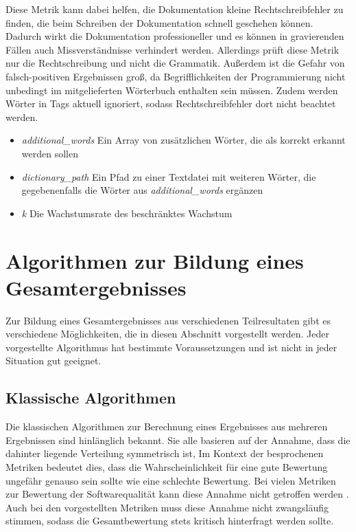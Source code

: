  Diese Metrik kann dabei helfen, die Dokumentation kleine Rechtschreibfehler zu finden, die beim Schreiben der Dokumentation schnell geschehen können. Dadurch wirkt die Dokumentation professioneller und es können in gravierenden Fällen auch Missverständnisse verhindert werden. Allerdings prüft diese Metrik nur die Rechtschreibung und nicht die Grammatik. Außerdem ist die Gefahr von falsch-positiven Ergebnissen groß, da Begrifflichkeiten der Programmierung nicht unbedingt im mitgelieferten Wörterbuch enthalten sein müssen. Zudem werden Wörter in Tags aktuell ignoriert, sodass Rechtschreibfehler dort nicht beachtet werden. 
 \begin{itemize}
    \item \textit{additional\_words} Ein Array von zusätzlichen Wörter, die als korrekt erkannt werden sollen
     \item
    \textit{dictionary\_path} Ein Pfad zu einer Textdatei mit weiteren Wörter, die gegebenenfalls die Wörter aus \textit{additional\_words} ergänzen
    \item \textit{k} Die Wachstumsrate des beschränktes Wachstum
   
  
 \end{itemize}  
 \section{Algorithmen zur Bildung eines Gesamtergebnisses}
Zur Bildung eines Gesamtergebnisses aus verschiedenen Teilresultaten gibt es verschiedene Möglichkeiten, die in diesen Abschnitt vorgestellt werden. Jeder vorgestellte Algorithmus hat bestimmte Voraussetzungen und ist nicht in jeder Situation gut geeignet.

\subsection{Klassische Algorithmen}
Die klassischen Algorithmen zur Berechnung eines Ergebnisses aus mehreren Ergebnissen sind hinlänglich bekannt. Sie alle basieren auf der Annahme, dass die dahinter liegende Verteilung symmetrisch ist, Im Kontext der besprochenen Metriken bedeutet dies, dass die Wahrscheinlichkeit für eine gute Bewertung ungefähr genauso sein sollte wie eine schlechte Bewertung. Bei vielen Metriken zur Bewertung der Softwarequalität kann diese Annahme nicht getroffen werden \cite[S. 313]{Youcantcontroltheunfamiliar:Astudyontherelationsbetweenaggregationtechniquesforsoftwaremetrics}. Auch bei den vorgestellten Metriken muss diese Annahme nicht zwangsläufig stimmen, sodass die Gesamtbewertung stets kritisch hinterfragt werden sollte. 
